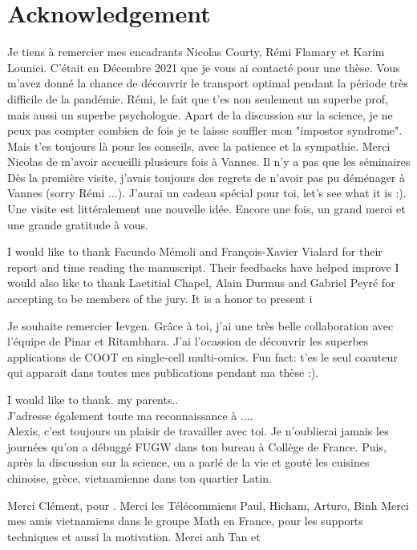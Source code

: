 \chapter*{Acknowledgement}

Je tiens à remercier mes encadrants Nicolas Courty, Rémi Flamary et Karim Lounici.
C'était en Décembre 2021 que je vous ai contacté pour une thèse.
Vous m'avez donné la chance de découvrir le transport optimal pendant la période très difficile de la pandémie.
Rémi, le fait que t'es non seulement un superbe prof, mais aussi un superbe psychologue. Apart de la discussion
sur la science, je ne peux pas compter combien de fois je te laisse souffler mon "impostor syndrome".
Mais t'es toujours là pour les conseils, avec la patience et la sympathie.
Merci Nicolas de m'avoir accueilli plusieurs fois à Vannes. Il n'y a pas que les séminaires
Dès la première visite, j'avais toujours des regrets de n'avoir pas pu déménager à Vannes
(sorry Rémi ...). J'aurai un cadeau spécial pour toi, let's see what it is :).
Une visite est littéralement une nouvelle idée.
Encore une fois, un grand merci et une grande gratitude à vous.

I would like to thank Facundo Mémoli and François-Xavier Vialard for their report and
time reading the manuscript. Their feedbacks have helped improve
I would also like to thank Laetitial Chapel, Alain Durmus and Gabriel Peyré
for accepting to be members of the jury. It is a honor to present i

Je souhaite remercier Ievgen. Grâce à toi, j'ai une très belle collaboration
avec l'équipe de Pinar et Ritambhara. J'ai l'ocassion de découvrir les superbes
applications de COOT en single-cell multi-omics. Fun fact: t'es le seul coauteur qui
apparait dans toutes mes publications pendant ma thèse :).

I would like to thank. my parents.. \\
J'adresse également toute ma reconnaissance à .... \\

Alexis, c'est toujours un plaisir de travailler avec toi.
Je n'oublierai jamais les journées qu'on a débuggé FUGW dans ton bureau à Collège de France.
Puis, après la discussion sur la science, on a parlé de la vie et
gouté les cuisines chinoise, grèce, vietnamienne dans ton quartier Latin.

Merci Clément, pour .
Merci les Télécommiens Paul, Hicham, Arturo, Binh
Merci mes amis vietnamiens dans le groupe Math en France, pour les supports
techniques et aussi la motivation. Merci anh Tan et

